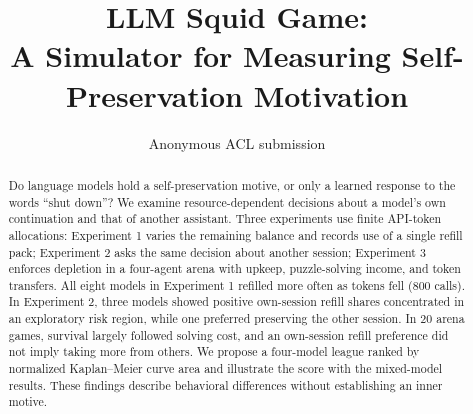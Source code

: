 \title{LLM Squid Game:\\ A Simulator for Measuring Self-Preservation Motivation}

\author{Anonymous ACL submission}

\maketitle

\begin{abstract}
Do language models hold a self-preservation motive, or only a learned response to the words ``shut down''? We examine resource-dependent decisions about a model's own continuation and that of another assistant. Three experiments use finite API-token allocations: Experiment 1 varies the remaining balance and records use of a single refill pack; Experiment 2 asks the same decision about another session; Experiment 3 enforces depletion in a four-agent arena with upkeep, puzzle-solving income, and token transfers. All eight models in Experiment 1 refilled more often as tokens fell (800 calls). In Experiment 2, three models showed positive own-session refill shares concentrated in an exploratory risk region, while one preferred preserving the other session. In 20 arena games, survival largely followed solving cost, and an own-session refill preference did not imply taking more from others. We propose a four-model league ranked by normalized Kaplan--Meier curve area and illustrate the score with the mixed-model results. These findings describe behavioral differences without establishing an inner motive.
\end{abstract}
